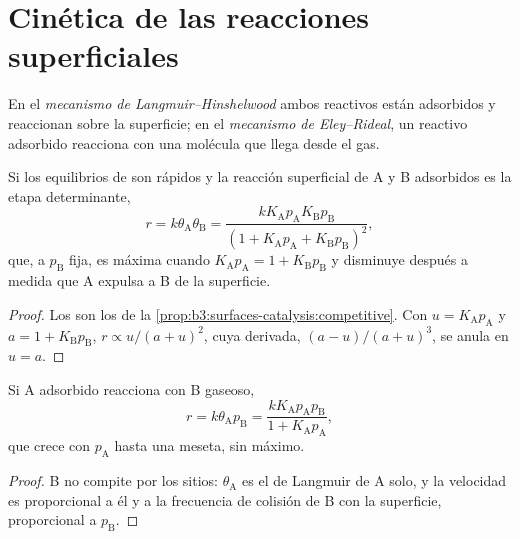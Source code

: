 \section{Cinética de las reacciones superficiales}

\begin{definition}\label{def:b3:surfaces-catalysis:mechanisms}
En el \emph{mecanismo de Langmuir--Hinshelwood}
ambos reactivos están adsorbidos y reaccionan sobre la superficie; en el
\emph{mecanismo de Eley--Rideal}, un reactivo adsorbido
reacciona con una molécula que llega desde el gas.
\end{definition}

\begin{proposition}\label{prop:b3:surfaces-catalysis:lh-rate}
Si los equilibrios de  son rápidos y la reacción superficial de A y B adsorbidos
es la etapa determinante,
\[
  r = k\theta_{\mathrm A}\theta_{\mathrm B} = \frac{kK_{\mathrm A}p_{\mathrm A}K_{\mathrm B}p_{\mathrm B}}{(1 + K_{\mathrm A}p_{\mathrm A} + K_{\mathrm B}p_{\mathrm B})^2},
\]
que, a $p_{\mathrm B}$ fija, es máxima cuando $K_{\mathrm A}p_{\mathrm A} = 1 + K_{\mathrm B}p_{\mathrm B}$ y disminuye después a medida que A expulsa a B de la
superficie.
\end{proposition}

\begin{proof}
Los  son los de la \cref{prop:b3:surfaces-catalysis:competitive}. Con $u =
K_{\mathrm A}p_{\mathrm A}$ y $a = 1 + K_{\mathrm B}p_{\mathrm B}$, $r \propto u/(a + u)^2$, cuya derivada, $(a - u)/(a + u)^3$, se anula en
$u = a$.
\end{proof}

\begin{proposition}\label{prop:b3:surfaces-catalysis:er-rate}
Si A adsorbido reacciona con B gaseoso,
\[
  r = k\theta_{\mathrm A}p_{\mathrm B} = \frac{kK_{\mathrm A}p_{\mathrm A}p_{\mathrm B}}{1 + K_{\mathrm A}p_{\mathrm A}},
\]
que crece con $p_{\mathrm A}$ hasta una meseta, sin máximo.
\end{proposition}

\begin{proof}
B no compite por los sitios: $\theta_{\mathrm A}$ es el  de Langmuir de A solo, y la
velocidad es proporcional a él y a la frecuencia de colisión de B con la superficie,
proporcional a $p_{\mathrm B}$.
\end{proof}

